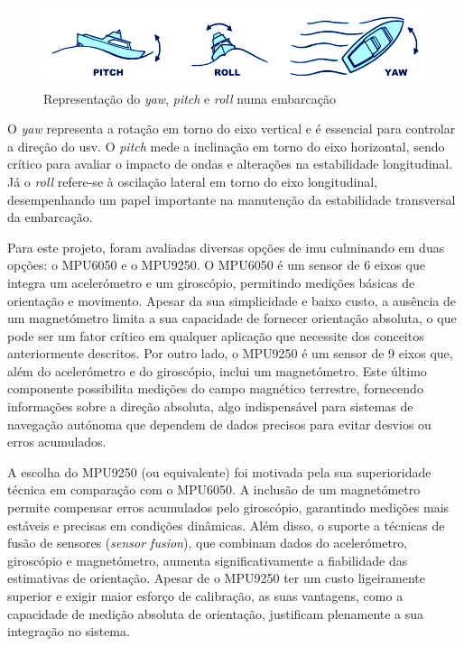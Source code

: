 \begin{figure}[H]
    \centering
    \includegraphics[height=0.2\linewidth]{figuras/Pitch-Roll-Yaw.png}
    \caption[Representação do \emph{yaw}, \emph{pitch} e \emph{roll} numa embarcação]{Representação do \emph{yaw}, \emph{pitch} e \emph{roll} numa embarcação \cite{imagem-yaw-pitch-roll}}
    \label{fig:pitch-roll-yaw}
\end{figure}

O \emph{yaw} representa a rotação em torno do eixo vertical e é essencial para controlar a direção do \gls{usv}. O \emph{pitch} mede a inclinação em torno do eixo horizontal, sendo crítico para avaliar o impacto de ondas e alterações na estabilidade longitudinal. Já o \emph{roll} refere-se à oscilação lateral em torno do eixo longitudinal, desempenhando um papel importante na manutenção da estabilidade transversal da embarcação.

Para este projeto, foram avaliadas diversas opções de \gls{imu} culminando em duas opções: o MPU6050 e o MPU9250. O MPU6050 é um sensor de 6 eixos que integra um acelerómetro e um giroscópio, permitindo medições básicas de orientação e movimento. Apesar da sua simplicidade e baixo custo, a ausência de um magnetómetro limita a sua capacidade de fornecer orientação absoluta, o que pode ser um fator crítico em qualquer aplicação que necessite dos conceitos anteriormente descritos. Por outro lado, o MPU9250 é um sensor de 9 eixos que, além do acelerómetro e do giroscópio, inclui um magnetómetro. Este último componente possibilita medições do campo magnético terrestre, fornecendo informações sobre a direção absoluta, algo indispensável para sistemas de navegação autónoma que dependem de dados precisos para evitar desvios ou erros acumulados.

A escolha do MPU9250 (ou equivalente) foi motivada pela sua superioridade técnica em comparação com o MPU6050. A inclusão de um magnetómetro permite compensar erros acumulados pelo giroscópio, garantindo medições mais estáveis e precisas em condições dinâmicas. Além disso, o suporte a técnicas de fusão de sensores (\emph{sensor fusion}), que combinam dados do acelerómetro, giroscópio e magnetómetro, aumenta significativamente a fiabilidade das estimativas de orientação. Apesar de o MPU9250 ter um custo ligeiramente superior e exigir maior esforço de calibração, as suas vantagens, como a capacidade de medição absoluta de orientação, justificam plenamente a sua integração no sistema.

